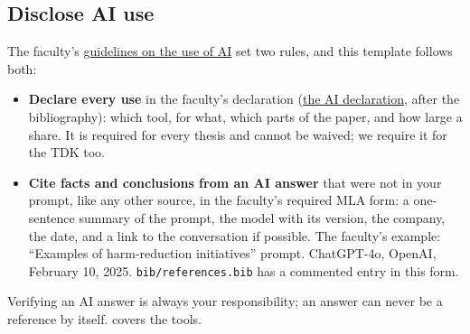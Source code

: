 \subsection{Disclose AI use}\label{app:writing:ai}
The faculty's \href{https://vik.bme.hu/page/1346/}{guidelines on the use of AI} set two rules, and this template follows both:
\begin{itemize}
  \item \textbf{Declare every use} in the faculty's declaration (\hyperref[aidecl]{the AI declaration}, after the bibliography): which tool, for what, which parts of the paper, and how large a share. It is required for every thesis and cannot be waived; we require it for the TDK too.
  \item \textbf{Cite facts and conclusions from an AI answer} that were not in your prompt, like any other source, in the faculty's required MLA form: a one-sentence summary of the prompt, the model with its version, the company, the date, and a link to the conversation if possible. The faculty's example: \enquote{Examples of harm-reduction initiatives} prompt. ChatGPT-4o, OpenAI, February 10, 2025. \texttt{bib/references.bib} has a commented entry in this form.
\end{itemize}
Verifying an AI answer is always your responsibility; an answer can never be a reference by itself.  covers the tools.
